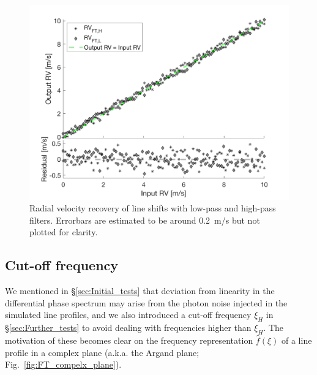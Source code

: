 
\begin{figure}[tbp]
\centering
\includegraphics[width = 0.7 \linewidth]
{./Figures/Methods/5-LINE_SHIFT_ONLY-HL.png}
\caption[Low-pass and high-pass radial velocities]
{Radial velocity recovery of line shifts with low-pass and high-pass filters. Errorbars are estimated to be around 0.2~m/s but not plotted for clarity.}
\label{fig:rv_recovery_LH}
\end{figure} 
\FloatBarrier

\subsection{Cut-off frequency}
\label{sec:noise}

We mentioned in \S\ref{sec:Initial_tests} that deviation from linearity in the differential phase spectrum may arise from the photon noise injected in the simulated line profiles, and we also introduced a cut-off frequency $\xi_{H}$ in \S\ref{sec:Further_tests} to avoid dealing with frequencies higher than $\xi_{H}$. The motivation of these becomes clear on the frequency representation $\hat{f}(\xi)$ of a line profile in a complex plane (a.k.a. the Argand plane; Fig.~\ref{fig:FT_compelx_plane}). 

